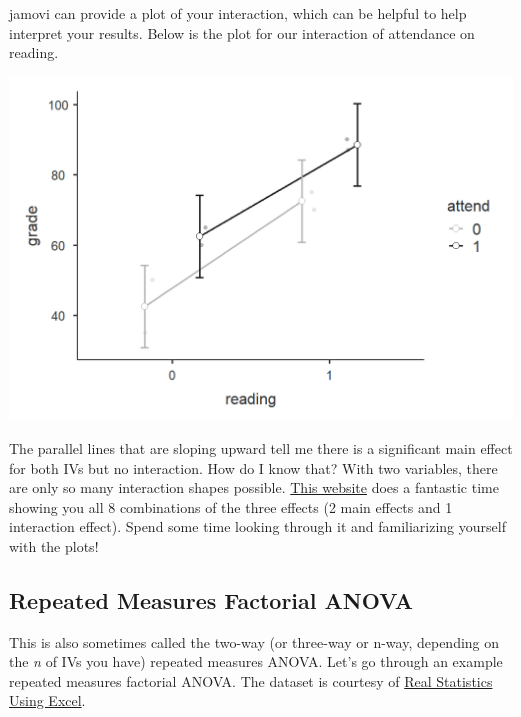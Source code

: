 \documentclass[
]{book}
\begin{document}
jamovi can provide a plot of your interaction, which can be helpful to help interpret your results. Below is the plot for our interaction of attendance on reading.

\includegraphics{images/06-factorial-anova/independent-factorial_plot.png}

The parallel lines that are sloping upward tell me there is a significant main effect for both IVs but no interaction. How do I know that? With two variables, there are only so many interaction shapes possible. \href{https://courses.washington.edu/smartpsy/interactions.htm}{This website} does a fantastic time showing you all 8 combinations of the three effects (2 main effects and 1 interaction effect). Spend some time looking through it and familiarizing yourself with the plots!

\hypertarget{repeated-measures-factorial-anova}{%
\subsection{Repeated Measures Factorial ANOVA}\label{repeated-measures-factorial-anova}}

This is also sometimes called the two-way (or three-way or n-way, depending on the \emph{n} of IVs you have) repeated measures ANOVA. Let's go through an example repeated measures factorial ANOVA. The dataset is courtesy of \href{https://www.real-statistics.com/anova-repeated-measures/two-within-subjects-factors/}{Real Statistics Using Excel}.
\end{document}

